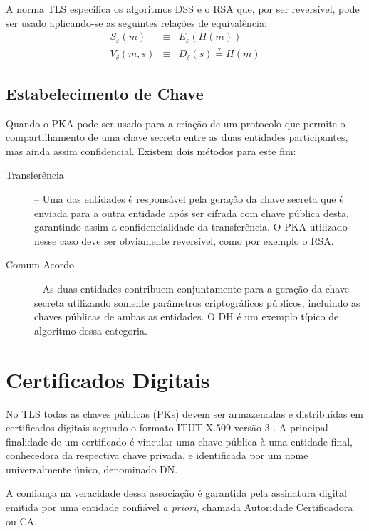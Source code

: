 A norma TLS especifica os algoritmos \ac{DSS} \cite{fips_dss} e o \acs{RSA} que, por ser reversível, pode ser 
usado aplicando-se as seguintes relações de equivalência:
\begin{eqnarray}
S_\varepsilon(m) & \equiv & E_\varepsilon(H(m)) \nonumber \\
V_\delta(m,s) & \equiv & D_\delta(s) \stackrel{?}{=} H(m) \nonumber
\end{eqnarray}

\subsection{Estabelecimento de Chave}

Quando o \acs{PKA} pode ser usado para a criação de um protocolo que permite o
compartilhamento de uma chave secreta entre as duas entidades participantes,
mas ainda assim confidencial. Existem dois métodos para este fim:
\begin{description}
	\item[Transferência] -- Uma das entidades é responsável pela geração da chave secreta que
	é enviada para a outra entidade após ser cifrada com chave pública desta, garantindo assim a
	confidencialidade da transferência.
	O PKA utilizado nesse caso deve ser obviamente reversível, como por exemplo o \acs{RSA}.
	\item[Comum Acordo] -- As duas entidades contribuem conjuntamente para a geração da chave secreta utilizando
	somente parâmetros criptográficos públicos, incluindo as chaves públicas de ambas as entidades.
	O \ac{DH} \cite{dh76} é um exemplo típico de algoritmo dessa categoria.
\end{description}

\section{Certificados Digitais}
\label{sec:certs}

No TLS todas as chaves públicas (PKs) devem ser armazenadas e distribuídas em certificados digitais
segundo o formato \acs{ITUT} X.509 versão 3 \cite{rfc_x509}. A principal finalidade de um
certificado é vincular uma chave pública à uma entidade final, conhecedora da respectiva
chave privada, e identificada por um nome universalmente único, denominado \acf{DN}.

A confiança na veracidade dessa associação é garantida pela assinatura digital emitida
por uma entidade confiável \emph{a priori}, chamada Autoridade Certificadora ou \ac{CA}.

